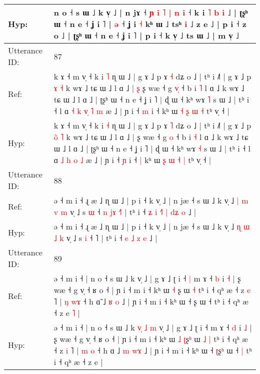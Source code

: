 \documentclass[10pt]{article}
\DeclareRobustCommand{\hl}[1]{{\textcolor{red}{#1}}}
\begin{document}
\begin{longtable}{ll}
 \\
Hyp: & n o ˧ s ɯ ˩ k v̩ ˩ | n jɤ ˧\hl{ }\hl{ɲ}\hl{ }\hl{i} \hl{˥} \hl{|} \hl{n}\hl{ }\hl{i} ˧ k i \hl{˥} \hl{b} \hl{i} ˩ | ʈʂʰ ɯ ˧ n e ˧ ʝ i ˥ | \hl{ə} ˧ ʝ i \hl{˧} kʰ ɯ ˩ tsʰ \hl{i} ˩ z e ˩ | p i ˧ z o ˩ | ʈʂʰ ɯ ˧ n e ˧ ʝ i ˥ | p i ˧ k v̩ ˩ ts ɯ ˩ | m v̩ ˩
 \\
\midrule
Utterance ID: & 87 \\
Ref: & k ɤ ˧ m v̩ ˧ k i \hl{˥} ɳ ɯ ˩ | g ɤ ˩ p ɤ \hl{˧} dʑ o ˩ | tʰ i ˩˥ | g ɤ ˩ p \hl{}\hl{ɤ} \hl{˧} k wɤ ˩ tɕ ɯ ˩ l ɑ ˩ |\hl{ }\hl{ʂ} ʂ wæ ˧ g \hl{v}\hl{̩} ˧ b i \hl{˥} l ɑ ˩ k wɤ ˩ tɕ ɯ ˩ l ɑ ˩ | ʈʂʰ ɯ ˧ n e ˧ ʝ i ˥ | ɖ ɯ ˧ kʰ wɤ \hl{˥} s ɯ ˩ | tʰ i ˧ l ɑ\hl{ }\hl{˧} \hl{k} \hl{v}\hl{̩} \hl{˥} \hl{m} æ ˩ | ɲ i ˧ \hl{m} i ˧\hl{}\hl{} kʰ ɯ \hl{˧} \hl{ʂ} \hl{ɯ} \hl{˧} tʰ v̩ ˧ |
 \\
Hyp: & k ɤ ˧ m v̩ ˧ k i \hl{˧} ɳ ɯ ˩ | g ɤ ˩ p ɤ \hl{˥} dʑ o ˩ | tʰ i ˩˥ | g ɤ ˩ p \hl{o}\hl{̃} \hl{˥} k wɤ ˩ tɕ ɯ ˩ l ɑ ˩ |\hl{}\hl{} ʂ wæ ˧ g \hl{}\hl{o} ˧ b i \hl{˧} l ɑ ˩ k wɤ ˩ tɕ ɯ ˩ l ɑ ˩ | ʈʂʰ ɯ ˧ n e ˧ ʝ i ˥ | ɖ ɯ ˧ kʰ wɤ \hl{˧} s ɯ ˩ | tʰ i ˧ l ɑ\hl{}\hl{} \hl{˩} \hl{}\hl{h} \hl{o} \hl{˩} æ ˩ | ɲ i ˧ \hl{ɲ} i ˧\hl{ }\hl{|} kʰ ɯ \hl{ʂ} \hl{ɯ} \hl{˧} \hl{|} tʰ v̩ ˧ |
 \\
\midrule
Utterance ID: & 88 \\
Ref: & ə ˧ m i ˧ ɻ æ ˩ ɳ ɯ ˩ | p i ˧ k v̩ ˩ | n jæ ˧ s ɯ ˩ k v̩ ˩ \hl{|} \hl{m} \hl{v} \hl{m} v̩ ˩ s \hl{ɯ} ˧\hl{ }\hl{n}\hl{ }\hl{j}\hl{ɤ} \hl{˧}˥ | tʰ i ˧\hl{ }\hl{ʑ}\hl{ }\hl{i} \hl{˧}\hl{˥} \hl{|} \hl{d}\hl{ʑ} \hl{o} ˩ |
 \\
Hyp: & ə ˧ m i ˧ ɻ æ ˩ ɳ ɯ ˩ | p i ˧ k v̩ ˩ | n jæ ˧ s ɯ ˩ k v̩ ˩ \hl{ɳ} \hl{ɯ} \hl{˩} \hl{k} v̩ ˩ s \hl{i} ˧\hl{}\hl{}\hl{}\hl{}\hl{} \hl{}˥ | tʰ i ˧\hl{}\hl{}\hl{}\hl{} \hl{}\hl{e} \hl{˩} \hl{}\hl{z} \hl{e} ˩ |
 \\
\midrule
Utterance ID: & 89 \\
Ref: & ə ˧ m i ˧ | n o ˧ s ɯ ˩ k\hl{}\hl{}\hl{}\hl{}\hl{}\hl{}\hl{} v̩ ˩ | g ɤ ˩ ʈ i ˧\hl{ }\hl{|} m ɤ ˧ \hl{b} i \hl{˧} | ʂ wæ ˧ g v̩ ˧ ʁ o ˧ | ɲ i ˧ m i ˧ kʰ ɯ \hl{˧} \hl{}ʂ\hl{} ɯ\hl{}\hl{} \hl{˧} tʰ i ˧ qʰ æ ˧ z \hl{e} ˥ | \hl{ŋ} \hl{w}\hl{ɤ} ˧ h ɑ\hl{̃} ˩ \hl{ʁ} \hl{}\hl{o} ˩ | ɲ i ˧ m i ˧ kʰ ɯ ˧ \hl{}ʂ\hl{} ɯ ˧\hl{}\hl{} tʰ i ˧ qʰ æ ˧ z e\hl{ }\hl{˥} |
 \\
Hyp: & ə ˧ m i ˧ | n o ˧ s ɯ ˩ k\hl{ }\hl{v}\hl{̩}\hl{ }\hl{˩}\hl{ }\hl{m} v̩ ˩ | g ɤ ˩ ʈ i ˧\hl{}\hl{} m ɤ ˧ \hl{d} i \hl{˩} | ʂ wæ ˧ g v̩ ˧ ʁ o ˧ | ɲ i ˧ m i ˧ kʰ ɯ \hl{˩} \hl{ʈ}ʂ\hl{ʰ} ɯ\hl{ }\hl{˩} \hl{|} tʰ i ˧ qʰ æ ˧ z \hl{i} ˥ | \hl{m} \hl{}\hl{o} ˧ h ɑ\hl{} ˩ \hl{m} \hl{w}\hl{ɤ} ˩ | ɲ i ˧ m i ˧ kʰ ɯ ˧ \hl{ʈ}ʂ\hl{ʰ} ɯ ˧\hl{ }\hl{|} tʰ i ˧ qʰ æ ˧ z e\hl{}\hl{} |

\end{longtable}
\end{document}
